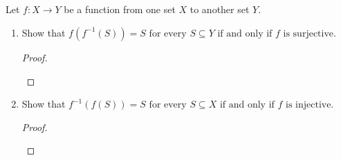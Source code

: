 \documentclass[../../main.tex]{subfiles}
\begin{document}
\addtocounter{subsection}{1}
\subsection{}
\begin{q}
    Let $f \colon X \to Y$ be a function from one set $X$ to another set $Y$. 
    
    \begin{enumerate}
        \item
        Show that $f(f^{-1}(S)) = S \text{ for every } S \subseteq Y \text{ if and only if } f \text{ is surjective.}$
        \begin{proof}
            
            \begin{xx}
                
            \end{xx}
        \end{proof}
        \item 
        Show that \(f^{-1}(f(S)) = S \text{ for every } S \subseteq X \text{ if and only if } f \text{ is injective.}\)
        \begin{proof}
            
            \begin{xx}
                
            \end{xx}
        \end{proof}
    \end{enumerate}

\end{q}
\end{document}
